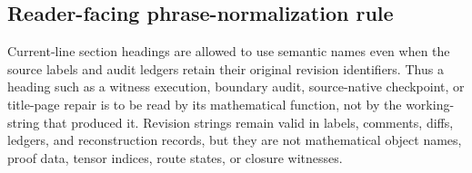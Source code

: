\subsection*{Reader-facing phrase-normalization rule}

Current-line section headings are allowed to use semantic names even when the
source labels and audit ledgers retain their original revision identifiers.
Thus a heading such as a witness execution, boundary audit, source-native
checkpoint, or title-page repair is to be read by its mathematical function,
not by the working-string that produced it.  Revision strings remain valid in
labels, comments, diffs, ledgers, and reconstruction records, but they are not
mathematical object names, proof data, tensor indices, route states, or closure
witnesses.


\thispagestyle{fancy}



